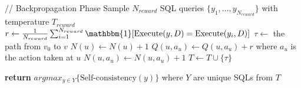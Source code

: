 \begin{algorithm}
\begin{algorithmic}[1]
    \STATE // Backpropagation Phase
    \STATE Sample $N_{reward}$ SQL queries $\{y_1,...,y_{N_{reward}}\}$ with temperature $T_{reward}$
    \STATE $r \gets \frac{1}{N_{reward}} \sum_{i=1}^{N_{reward}} \mathbbm{1}[\text{Execute}(y,D) = \text{Execute}(y_i,D)]$
    \STATE $\tau \gets$ the path from $v_0$ to $v$
        \STATE $N(u) \gets N(u) + 1$
        \STATE $Q(u,a_u) \gets Q(u,a_u) + r$ where $a_u$ is the action taken at $u$
        \STATE $N(u,a_u) \gets N(u,a_u) + 1$
    \ENDFOR
    \STATE $T \gets T \cup \{\tau\}$


\ENDFOR

\STATE \textbf{return} $argmax_{y \in Y} \{\text{Self-consistency}(y)\}$ where $Y$ are unique SQLs from $T$

\end{algorithmic}
\end{algorithm}



